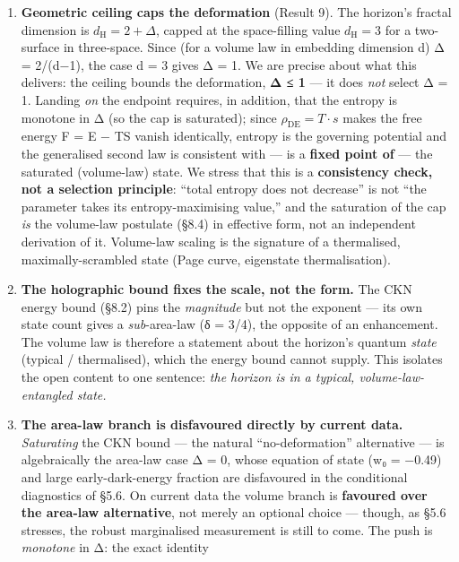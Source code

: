 \documentclass[
  10pt,
]{article}
\providecommand{\tightlist}{%
  \setlength{\itemsep}{0pt}\setlength{\parskip}{0pt}}
\begin{document}
\begin{enumerate}
\def\labelenumi{\arabic{enumi}.}
\tightlist
\item
  \textbf{Geometric ceiling caps the deformation} (Result 9). The
  horizon's fractal dimension is \(d_{\mathrm{H}} = 2 + \Delta\), capped
  at the space-filling value \(d_{\mathrm{H}} = 3\) for a two-surface in
  three-space. Since (for a volume law in embedding dimension d) Δ =
  2/(d−1), the case d = 3 gives Δ = 1. We are precise about what this
  delivers: the ceiling bounds the deformation, \textbf{Δ ≤ 1} --- it
  does \emph{not} select Δ = 1. Landing \emph{on} the endpoint requires,
  in addition, that the entropy is monotone in Δ (so the cap is
  saturated); since \(\rho _{\mathrm{DE}} = T\cdot s\) makes the free
  energy F = E − TS vanish identically, entropy is the governing
  potential and the generalised second law is consistent with --- is a
  \textbf{fixed point of} --- the saturated (volume-law) state. We
  stress that this is a \textbf{consistency check, not a selection
  principle}: ``total entropy does not decrease'' is not ``the parameter
  takes its entropy-maximising value,'' and the saturation of the cap
  \emph{is} the volume-law postulate (§8.4) in effective form, not an
  independent derivation of it. Volume-law scaling is the signature of a
  thermalised, maximally-scrambled state (Page curve, eigenstate
  thermalisation).
\item
  \textbf{The holographic bound fixes the scale, not the form.} The CKN
  energy bound (§8.2) pins the \emph{magnitude} but not the exponent ---
  its own state count gives a \emph{sub}-area-law (δ = 3/4), the
  opposite of an enhancement. The volume law is therefore a statement
  about the horizon's quantum \emph{state} (typical / thermalised),
  which the energy bound cannot supply. This isolates the open content
  to one sentence: \emph{the horizon is in a typical,
  volume-law-entangled state.}
\item
  \textbf{The area-law branch is disfavoured directly by current data.}
  \emph{Saturating} the CKN bound --- the natural ``no-deformation''
  alternative --- is algebraically the area-law case Δ = 0, whose
  equation of state (w₀ = −0.49) and large early-dark-energy fraction
  are disfavoured in the conditional diagnostics of §5.6. On current
  data the volume branch is \textbf{favoured over the area-law
  alternative}, not merely an optional choice --- though, as §5.6
  stresses, the robust marginalised measurement is still to come. The
  push is \emph{monotone} in Δ: the exact identity

\end{enumerate}
\end{document}
